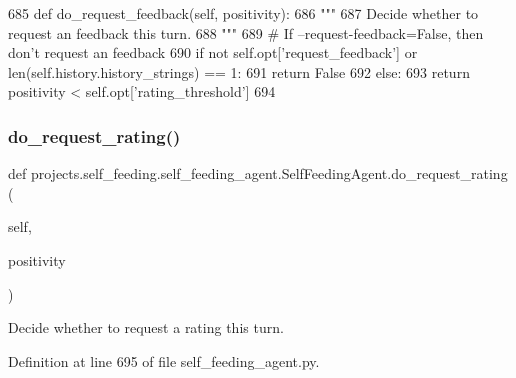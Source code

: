 \begin{DoxyCode}
685     \textcolor{keyword}{def }do\_request\_feedback(self, positivity):
686         \textcolor{stringliteral}{"""}
687 \textcolor{stringliteral}{        Decide whether to request an feedback this turn.}
688 \textcolor{stringliteral}{        """}
689         \textcolor{comment}{# If --request-feedback=False, then don't request an feedback}
690         \textcolor{keywordflow}{if} \textcolor{keywordflow}{not} self.opt[\textcolor{stringliteral}{'request\_feedback'}] \textcolor{keywordflow}{or} len(self.history.history\_strings) == 1:
691             \textcolor{keywordflow}{return} \textcolor{keyword}{False}
692         \textcolor{keywordflow}{else}:
693             \textcolor{keywordflow}{return} positivity < self.opt[\textcolor{stringliteral}{'rating\_threshold'}]
694 
\end{DoxyCode}
\mbox{\label{classprojects_1_1self__feeding_1_1self__feeding__agent_1_1SelfFeedingAgent_af0cd2239c4610157ac513163eb9437a3}} 
\subsubsection{\texorpdfstring{do\+\_\+request\+\_\+rating()}{do\_request\_rating()}}
{\footnotesize\ttfamily def projects.\+self\+\_\+feeding.\+self\+\_\+feeding\+\_\+agent.\+Self\+Feeding\+Agent.\+do\+\_\+request\+\_\+rating (\begin{DoxyParamCaption}\item[{}]{self,  }\item[{}]{positivity }\end{DoxyParamCaption})}

\begin{DoxyVerb}Decide whether to request a rating this turn.
\end{DoxyVerb}
 

Definition at line 695 of file self\+\_\+feeding\+\_\+agent.\+py.


